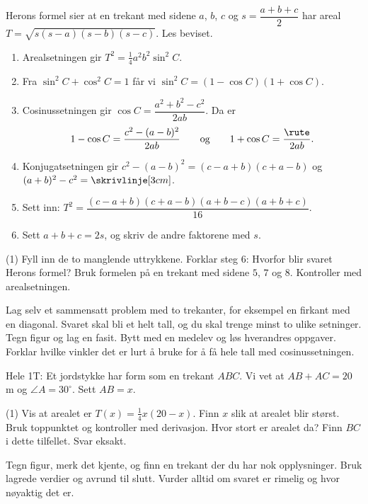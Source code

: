 Herons formel sier at en trekant med sidene $a$, $b$, $c$ og $s = \dfrac{a+b+c}{2}$ har areal $T = \sqrt{s(s-a)(s-b)(s-c)}$. Les beviset.
\begin{enumerate}[leftmargin=1.6em,itemsep=2pt,topsep=2pt]
  \item Arealsetningen gir $T^2 = \frac14 a^2b^2 \sin^2 C$.
  \item Fra $\sin^2 C + \cos^2 C = 1$ får vi $\sin^2 C = (1 - \cos C)(1 + \cos C)$.
  \item Cosinussetningen gir $\cos C = \dfrac{a^2 + b^2 - c^2}{2ab}$. Da er
  \[ 1 - \cos C = \frac{c^2 - (a-b)^2}{2ab} \qquad\text{og}\qquad 1 + \cos C = \frac{\rute}{2ab}. \]
  \item Konjugatsetningen gir $c^2 - (a-b)^2 = (c - a + b)(c + a - b)$ og $(a+b)^2 - c^2 = \skrivlinje[3cm]$.
  \item Sett inn: $T^2 = \dfrac{(c-a+b)(c+a-b)(a+b-c)(a+b+c)}{16}$.
  \item Sett $a + b + c = 2s$, og skriv de andre faktorene med $s$.
\end{enumerate}
\begin{tasks}(1)
  \task Fyll inn de to manglende uttrykkene.
  \task Forklar steg 6: Hvorfor blir svaret Herons formel?
  \task Bruk formelen på en trekant med sidene $5$, $7$ og $8$. Kontroller med arealsetningen.
\end{tasks}

Lag selv et sammensatt problem med to trekanter, for eksempel en firkant med en diagonal. Svaret skal bli et helt tall, og du skal trenge minst to ulike setninger. Tegn figur og lag en fasit. Bytt med en medelev og løs hverandres oppgaver. Forklar hvilke vinkler det er lurt å bruke for å få hele tall med cosinussetningen.

Hele 1T: Et jordstykke har form som en trekant $ABC$. Vi vet at $AB + AC = 20$ m og $\angle A = 30^\circ$. Sett $AB = x$.
\begin{tasks}(1)
  \task Vis at arealet er $T(x) = \frac14 x(20 - x)$.
  \task Finn $x$ slik at arealet blir størst. Bruk toppunktet og kontroller med derivasjon. Hvor stort er arealet da?
  \task Finn $BC$ i dette tilfellet. Svar eksakt.
\end{tasks}

\begin{oppsummering}
Tegn figur, merk det kjente, og finn en trekant der du har nok opplysninger.
Bruk lagrede verdier og avrund til slutt. Vurder alltid om svaret er rimelig og hvor nøyaktig det er.
\end{oppsummering}
